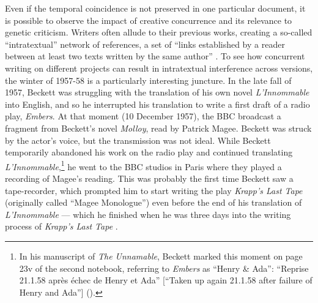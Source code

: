 \begin{paper}
Even if the temporal coincidence is not preserved in one particular
document, it is possible to observe the impact of creative concurrence
and its relevance to genetic criticism. Writers often allude to their
previous works, creating a so-called ``intratextual'' network of
references, a set of ``links established by a reader between at least
two texts written by the same author'' \citep[93]{martel_les_2005}. To see how
concurrent writing on different projects can result in intratextual
interference across versions, the winter of 1957-58 is a particularly
interesting juncture. In the late fall of 1957, Beckett was struggling
with the translation of his own novel \emph{L'Innommable} into English,
and so he interrupted his translation to write a first draft of a radio
play, \emph{Embers}. At that moment (10 December 1957), the BBC
broadcast a fragment from Beckett's novel \emph{Molloy}, read by Patrick
Magee. Beckett was struck by the actor's voice, but the transmission was
not ideal. While Beckett temporarily abandoned his work on the radio
play and continued translating \emph{L'Innommable},\footnote{In his
  manuscript of \emph{The Unnamable}, Beckett marked this moment on page
  23v of the second notebook, referring to \emph{Embers} as ``Henry \&
  Ada'': ``Reprise 21.1.58 après échec de Henry et Ada'' {[}``Taken up
  again 21.1.58 after failure of Henry and Ada''{]} ().} he went to the BBC studios in Paris where they played a
recording of Magee's reading. This was probably the first time Beckett
saw a tape-recorder, which prompted him to start writing the play
\emph{Krapp's Last Tape} (originally called ``Magee Monologue'') even
before the end of his translation of \emph{L'Innommable} --- which he
finished when he was three days into the writing process of
\emph{Krapp's Last Tape} \citep[138--50]{van_hulle_making_2015}.


\end{paper}

